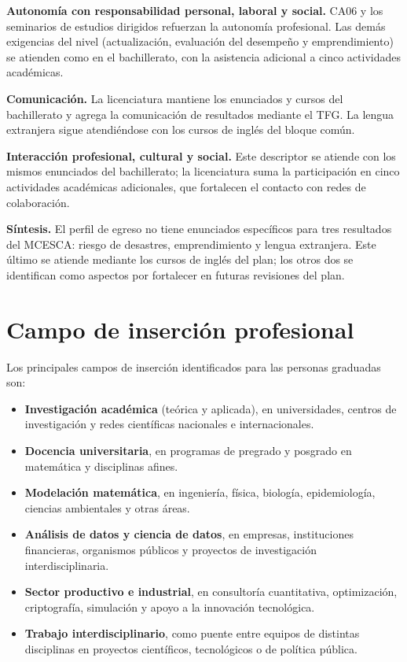 \documentclass[11pt,a4paper]{article}
\begin{document}
\textbf{Autonomía con responsabilidad personal, laboral y social.} CA06 y los seminarios de estudios dirigidos refuerzan la autonomía profesional. Las demás exigencias del nivel (actualización, evaluación del desempeño y emprendimiento) se atienden como en el bachillerato, con la asistencia adicional a cinco actividades académicas.

\textbf{Comunicación.} La licenciatura mantiene los enunciados y cursos del bachillerato y agrega la comunicación de resultados mediante el TFG. La lengua extranjera sigue atendiéndose con los cursos de inglés del bloque común.

\textbf{Interacción profesional, cultural y social.} Este descriptor se atiende con los mismos enunciados del bachillerato; la licenciatura suma la participación en cinco actividades académicas adicionales, que fortalecen el contacto con redes de colaboración.

\textbf{Síntesis.} El perfil de egreso no tiene enunciados específicos para tres resultados del MCESCA: riesgo de desastres, emprendimiento y lengua extranjera. Este último se atiende mediante los cursos de inglés del plan; los otros dos se identifican como aspectos por fortalecer en futuras revisiones del plan.
\endgroup

\section{Campo de inserción profesional}

Los principales campos de inserción identificados para las personas graduadas son:
\begin{itemize}
  \item \textbf{Investigación académica} (teórica y aplicada), en universidades, centros de investigación y redes científicas nacionales e internacionales.
  \item \textbf{Docencia universitaria}, en programas de pregrado y posgrado en matemática y disciplinas afines.
  \item \textbf{Modelación matemática}, en ingeniería, física, biología, epidemiología, ciencias ambientales y otras áreas.
  \item \textbf{Análisis de datos y ciencia de datos}, en empresas, instituciones financieras, organismos públicos y proyectos de investigación interdisciplinaria.
  \item \textbf{Sector productivo e industrial}, en consultoría cuantitativa, optimización, criptografía, simulación y apoyo a la innovación tecnológica.
  \item \textbf{Trabajo interdisciplinario}, como puente entre equipos de distintas disciplinas en proyectos científicos, tecnológicos o de política pública.
\end{itemize}
\end{document}
